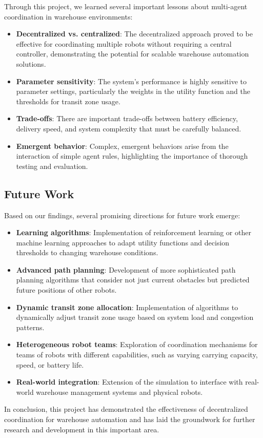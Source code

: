\documentclass[12pt,a4paper]{article}
\begin{document}
Through this project, we learned several important lessons about multi-agent coordination in warehouse environments:

\begin{itemize}
    \item \textbf{Decentralized vs. centralized}: The decentralized approach proved to be effective for coordinating multiple robots without requiring a central controller, demonstrating the potential for scalable warehouse automation solutions.

    \item \textbf{Parameter sensitivity}: The system's performance is highly sensitive to parameter settings, particularly the weights in the utility function and the thresholds for transit zone usage.

    \item \textbf{Trade-offs}: There are important trade-offs between battery efficiency, delivery speed, and system complexity that must be carefully balanced.

    \item \textbf{Emergent behavior}: Complex, emergent behaviors arise from the interaction of simple agent rules, highlighting the importance of thorough testing and evaluation.
\end{itemize}

\subsection{Future Work}

Based on our findings, several promising directions for future work emerge:

\begin{itemize}
    \item \textbf{Learning algorithms}: Implementation of reinforcement learning or other machine learning approaches to adapt utility functions and decision thresholds to changing warehouse conditions.

    \item \textbf{Advanced path planning}: Development of more sophisticated path planning algorithms that consider not just current obstacles but predicted future positions of other robots.

    \item \textbf{Dynamic transit zone allocation}: Implementation of algorithms to dynamically adjust transit zone usage based on system load and congestion patterns.

    \item \textbf{Heterogeneous robot teams}: Exploration of coordination mechanisms for teams of robots with different capabilities, such as varying carrying capacity, speed, or battery life.

    \item \textbf{Real-world integration}: Extension of the simulation to interface with real-world warehouse management systems and physical robots.
\end{itemize}

In conclusion, this project has demonstrated the effectiveness of decentralized coordination for warehouse automation and has laid the groundwork for further research and development in this important area.

\printbibliography
\end{document}
